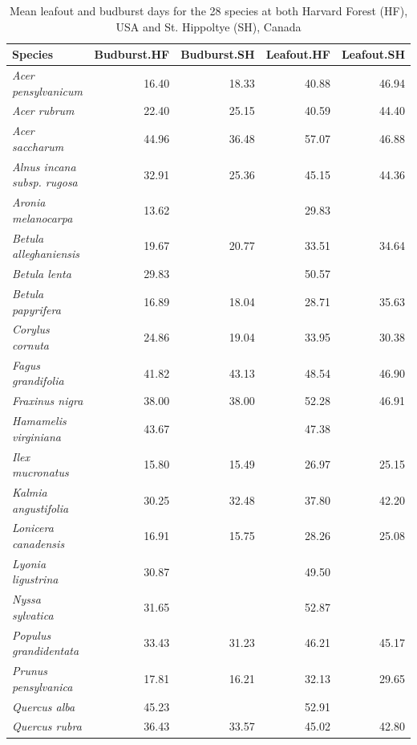 \documentclass{article}
\begin{document}
\begin{table}[ht]
\centering
\caption{Mean leafout and budburst days for the 28 species at both Harvard Forest (HF), USA and St. Hippoltye (SH), Canada} 
\begin{tabular}{lrrrr}
  \hline
Species & Budburst.HF & Budburst.SH & Leafout.HF & Leafout.SH \\ 
  \hline
\textit{Acer pensylvanicum} & 16.40 & 18.33 & 40.88 & 46.94 \\ 
  \textit{Acer rubrum} & 22.40 & 25.15 & 40.59 & 44.40 \\ 
  \textit{Acer saccharum} & 44.96 & 36.48 & 57.07 & 46.88 \\ 
  \textit{Alnus incana subsp. rugosa} & 32.91 & 25.36 & 45.15 & 44.36 \\ 
  \textit{Aronia melanocarpa} & 13.62 &  & 29.83 &  \\ 
  \textit{Betula alleghaniensis} & 19.67 & 20.77 & 33.51 & 34.64 \\ 
  \textit{Betula lenta} & 29.83 &  & 50.57 &  \\ 
  \textit{Betula papyrifera} & 16.89 & 18.04 & 28.71 & 35.63 \\ 
  \textit{Corylus cornuta} & 24.86 & 19.04 & 33.95 & 30.38 \\ 
  \textit{Fagus grandifolia} & 41.82 & 43.13 & 48.54 & 46.90 \\ 
  \textit{Fraxinus nigra} & 38.00 & 38.00 & 52.28 & 46.91 \\ 
  \textit{Hamamelis virginiana} & 43.67 &  & 47.38 &  \\ 
  \textit{Ilex mucronatus} & 15.80 & 15.49 & 26.97 & 25.15 \\ 
  \textit{Kalmia angustifolia} & 30.25 & 32.48 & 37.80 & 42.20 \\ 
  \textit{Lonicera canadensis} & 16.91 & 15.75 & 28.26 & 25.08 \\ 
  \textit{Lyonia ligustrina} & 30.87 &  & 49.50 &  \\ 
  \textit{Nyssa sylvatica} & 31.65 &  & 52.87 &  \\ 
  \textit{Populus grandidentata} & 33.43 & 31.23 & 46.21 & 45.17 \\ 
  \textit{Prunus pensylvanica} & 17.81 & 16.21 & 32.13 & 29.65 \\ 
  \textit{Quercus alba} & 45.23 &  & 52.91 &  \\ 
  \textit{Quercus rubra} & 36.43 & 33.57 & 45.02 & 42.80 \\ 

\end{tabular}
\end{table}
\end{document}
